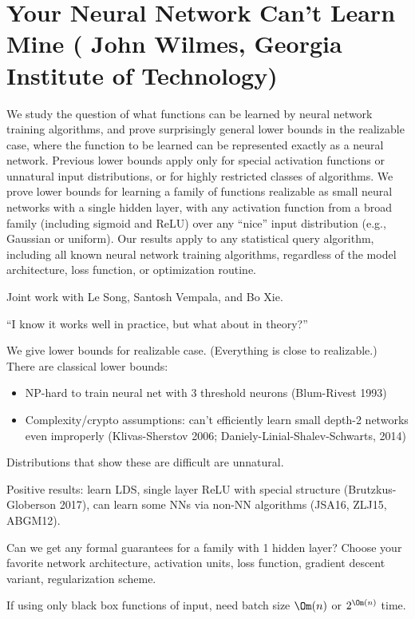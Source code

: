 \section{Your Neural Network Can't Learn Mine (
John Wilmes, Georgia Institute of Technology)}

We study the question of what functions can be learned by neural network training algorithms, and prove surprisingly general lower bounds in the realizable case, where the function to be learned can be represented exactly as a neural network. Previous lower bounds apply only for special activation functions or unnatural input distributions, or for highly restricted classes of algorithms. We prove lower bounds for learning a family of functions realizable as small neural networks with a single hidden layer, with any activation function from a broad family (including sigmoid and ReLU) over any ``nice'' input distribution (e.g., Gaussian or uniform). Our results apply to any statistical query algorithm, including all known neural network training algorithms, regardless of the model architecture, loss function, or optimization routine.
 
Joint work with Le Song, Santosh Vempala, and Bo Xie.

``I know it works well in practice, but what about in theory?''

We give lower bounds for realizable case. (Everything is close to realizable.) There are classical lower bounds:
\begin{itemize}
\item
NP-hard to train neural net with 3 threshold neurons (Blum-Rivest 1993)
\item
Complexity/crypto assumptions: can't efficiently learn small depth-2 networks even improperly (Klivas-Sherstov 2006; Daniely-Linial-Shalev-Schwarts, 2014)
\end{itemize}
Distributions that show these are difficult are unnatural. 

Positive results: learn LDS, single layer ReLU with special structure (Brutzkus-Globerson 2017), can learn some NNs via non-NN algorithms (JSA16, ZLJ15, ABGM12).

Can we get any formal guarantees for a family with 1 hidden layer? Choose your favorite network architecture, activation units, loss function, gradient descent variant, regularization scheme. 

\begin{thm}
If using only black box functions of input, need batch size $\Om(n)$ or $2^{\Om(n)}$ time.
\end{thm}

